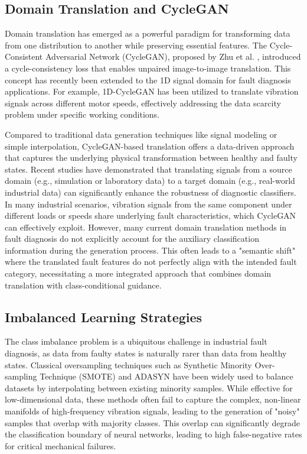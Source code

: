 \subsection{Domain Translation and CycleGAN}
Domain translation has emerged as a powerful paradigm for transforming data from one distribution to another while preserving essential features. The Cycle-Consistent Adversarial Network (CycleGAN), proposed by Zhu et al. \cite{4}, introduced a cycle-consistency loss that enables unpaired image-to-image translation. This concept has recently been extended to the 1D signal domain for fault diagnosis applications. For example, 1D-CycleGAN \cite{37} has been utilized to translate vibration signals across different motor speeds, effectively addressing the data scarcity problem under specific working conditions.

Compared to traditional data generation techniques like signal modeling or simple interpolation, CycleGAN-based translation \cite{36} offers a data-driven approach that captures the underlying physical transformation between healthy and faulty states. Recent studies \cite{36} have demonstrated that translating signals from a source domain (e.g., simulation or laboratory data) to a target domain (e.g., real-world industrial data) can significantly enhance the robustness of diagnostic classifiers. In many industrial scenarios, vibration signals from the same component under different loads or speeds share underlying fault characteristics, which CycleGAN can effectively exploit. However, many current domain translation methods in fault diagnosis do not explicitly account for the auxiliary classification information during the generation process. This often leads to a "semantic shift" where the translated fault features do not perfectly align with the intended fault category, necessitating a more integrated approach that combines domain translation with class-conditional guidance.

\subsection{Imbalanced Learning Strategies}
The class imbalance problem is a ubiquitous challenge in industrial fault diagnosis, as data from faulty states is naturally rarer than data from healthy states. Classical oversampling techniques such as Synthetic Minority Over-sampling Technique (SMOTE) \cite{6} and ADASYN \cite{35} have been widely used to balance datasets by interpolating between existing minority samples. While effective for low-dimensional data, these methods often fail to capture the complex, non-linear manifolds of high-frequency vibration signals, leading to the generation of "noisy" samples that overlap with majority classes. This overlap can significantly degrade the classification boundary of neural networks, leading to high false-negative rates for critical mechanical failures.

